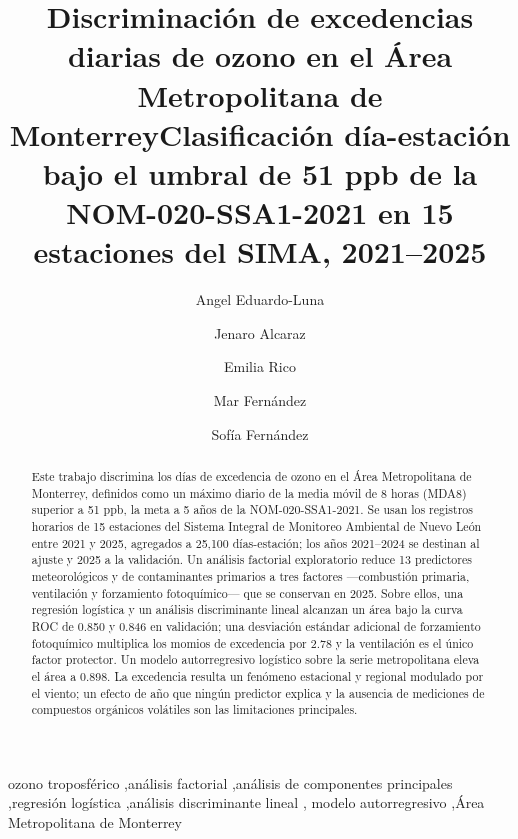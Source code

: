 \documentclass[a4paper]{cas-dc}
\begin{document}
\title[mode=title]{Discriminación de excedencias diarias de ozono en el Área Metropolitana de Monterrey}
\title[mode=sub]{Clasificación día-estación bajo el umbral de 51 ppb de la NOM-020-SSA1-2021 en 15 estaciones del SIMA, 2021--2025}

\author[1]{Angel Eduardo-Luna}
\author[1]{Jenaro Alcaraz}
\author[1]{Emilia Rico}
\author[1]{Mar Fernández}
\author[1]{Sofía Fernández}


\begin{abstract}
Este trabajo discrimina los días de excedencia de ozono en el Área
Metropolitana de Monterrey, definidos como un máximo diario de la media móvil
de 8 horas (MDA8) superior a 51 ppb, la meta a 5 años de la
NOM-020-SSA1-2021. Se usan los registros horarios de 15 estaciones del
Sistema Integral de Monitoreo Ambiental de Nuevo León entre 2021 y 2025,
agregados a 25,100 días-estación; los años 2021--2024 se destinan al ajuste y
2025 a la validación. Un análisis factorial exploratorio reduce 13 predictores
meteorológicos y de contaminantes primarios a tres factores ---combustión
primaria, ventilación y forzamiento fotoquímico--- que se conservan en 2025.
Sobre ellos, una regresión logística y un análisis discriminante lineal
alcanzan un área bajo la curva ROC de 0.850 y 0.846 en validación; una
desviación estándar adicional de forzamiento fotoquímico multiplica los momios
de excedencia por 2.78 y la ventilación es el único factor protector. Un
modelo autorregresivo logístico sobre la serie metropolitana eleva el área a
0.898. La excedencia resulta un fenómeno estacional y regional modulado por el
viento; un efecto de año que ningún predictor explica y la ausencia de
mediciones de compuestos orgánicos volátiles son las limitaciones principales.
\end{abstract}

\begin{keywords}
ozono troposférico \sep análisis factorial \sep análisis de componentes
principales \sep regresión logística \sep análisis discriminante lineal \sep
modelo autorregresivo \sep Área Metropolitana de Monterrey
\end{keywords}

\maketitle
{}
\end{document}
